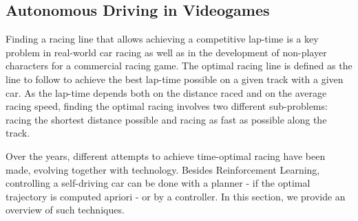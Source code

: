 \subsection{Autonomous Driving in Videogames}
Finding a racing line that allows achieving a competitive lap-time is a key problem in real-world car racing as well as in the development of non-player characters for a commercial racing game.
The optimal racing line is defined as the line to follow to achieve the best lap-time possible on a given track with a given car. As the lap-time depends both on the distance raced and on the average racing speed, finding the optimal racing involves two different sub-problems: racing the shortest distance possible and racing as fast as possible along the track.

Over the years, different attempts to achieve time-optimal racing have been made, evolving together with technology. Besides Reinforcement Learning, controlling a self-driving car can be done with a planner - if the optimal trajectory is computed apriori - or by a controller. In this section, we provide an overview of such techniques. 


